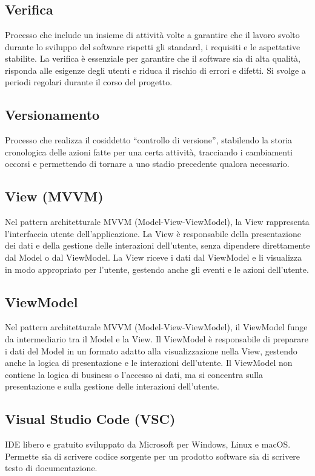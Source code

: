 
\section{}

\hypertarget{sec:verifica}{}
\subsection*{Verifica}
Processo che include un insieme di attività volte a garantire che il lavoro svolto durante lo sviluppo del software rispetti gli standard, i requisiti e 
le aspettative stabilite. La verifica è essenziale per garantire che il software sia di alta qualità, risponda alle esigenze degli utenti e riduca il 
rischio di errori e difetti. Si svolge a periodi regolari durante il corso del progetto.

\subsection*{Versionamento}
Processo che realizza il cosiddetto “controllo di versione”, stabilendo la storia cronologica delle azioni fatte per una certa attività, tracciando i 
cambiamenti occorsi e permettendo di tornare a uno stadio precedente qualora necessario.

\hypertarget{sec:view_mvvm}{}
\subsection*{View (MVVM)}
Nel pattern architetturale MVVM (Model-View-ViewModel), la View rappresenta l'interfaccia utente dell'applicazione. La View è responsabile della
presentazione dei dati e della gestione delle interazioni dell'utente, senza dipendere direttamente dal Model o dal ViewModel. La View riceve i dati
dal ViewModel e li visualizza in modo appropriato per l'utente, gestendo anche gli eventi e le azioni dell'utente.

\hypertarget{sec:viewmodel}{}
\subsection*{ViewModel}
Nel pattern architetturale MVVM (Model-View-ViewModel), il ViewModel funge da intermediario tra il Model e la View. Il ViewModel è responsabile di
preparare i dati del Model in un formato adatto alla visualizzazione nella View, gestendo anche la logica di presentazione e le interazioni dell'utente.
Il ViewModel non contiene la logica di business o l'accesso ai dati, ma si concentra sulla presentazione e sulla gestione delle interazioni dell'utente.

\hypertarget{sec:VSC}{}
\subsection*{Visual Studio Code (VSC)}
IDE libero e gratuito sviluppato da Microsoft per Windows, Linux e macOS. Permette sia di scrivere codice 
sorgente per un prodotto software sia di scrivere testo di documentazione.

\newpage